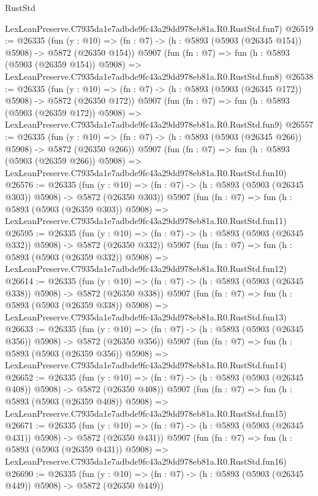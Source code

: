 \begin{lexlean}{RustStd}
\begin{coremodule}
    LexLeanPreserve.C7935da1e7adbde9fc43a29dd978eb81a.R0.RustStd.fun7)
@26519 := @26335
    (fun (y : @10) => (fn : @7) -> (h : @5893 (@5903 (@26345 @154)) @5908) -> @5872 (@26350 @154))
    @5907
    (fun (fn : @7) =>
    fun (h : @5893 (@5903 (@26359 @154)) @5908) =>
    LexLeanPreserve.C7935da1e7adbde9fc43a29dd978eb81a.R0.RustStd.fun8)
@26538 := @26335
    (fun (y : @10) => (fn : @7) -> (h : @5893 (@5903 (@26345 @172)) @5908) -> @5872 (@26350 @172))
    @5907
    (fun (fn : @7) =>
    fun (h : @5893 (@5903 (@26359 @172)) @5908) =>
    LexLeanPreserve.C7935da1e7adbde9fc43a29dd978eb81a.R0.RustStd.fun9)
@26557 := @26335
    (fun (y : @10) => (fn : @7) -> (h : @5893 (@5903 (@26345 @266)) @5908) -> @5872 (@26350 @266))
    @5907
    (fun (fn : @7) =>
    fun (h : @5893 (@5903 (@26359 @266)) @5908) =>
    LexLeanPreserve.C7935da1e7adbde9fc43a29dd978eb81a.R0.RustStd.fun10)
@26576 := @26335
    (fun (y : @10) => (fn : @7) -> (h : @5893 (@5903 (@26345 @303)) @5908) -> @5872 (@26350 @303))
    @5907
    (fun (fn : @7) =>
    fun (h : @5893 (@5903 (@26359 @303)) @5908) =>
    LexLeanPreserve.C7935da1e7adbde9fc43a29dd978eb81a.R0.RustStd.fun11)
@26595 := @26335
    (fun (y : @10) => (fn : @7) -> (h : @5893 (@5903 (@26345 @332)) @5908) -> @5872 (@26350 @332))
    @5907
    (fun (fn : @7) =>
    fun (h : @5893 (@5903 (@26359 @332)) @5908) =>
    LexLeanPreserve.C7935da1e7adbde9fc43a29dd978eb81a.R0.RustStd.fun12)
@26614 := @26335
    (fun (y : @10) => (fn : @7) -> (h : @5893 (@5903 (@26345 @338)) @5908) -> @5872 (@26350 @338))
    @5907
    (fun (fn : @7) =>
    fun (h : @5893 (@5903 (@26359 @338)) @5908) =>
    LexLeanPreserve.C7935da1e7adbde9fc43a29dd978eb81a.R0.RustStd.fun13)
@26633 := @26335
    (fun (y : @10) => (fn : @7) -> (h : @5893 (@5903 (@26345 @356)) @5908) -> @5872 (@26350 @356))
    @5907
    (fun (fn : @7) =>
    fun (h : @5893 (@5903 (@26359 @356)) @5908) =>
    LexLeanPreserve.C7935da1e7adbde9fc43a29dd978eb81a.R0.RustStd.fun14)
@26652 := @26335
    (fun (y : @10) => (fn : @7) -> (h : @5893 (@5903 (@26345 @408)) @5908) -> @5872 (@26350 @408))
    @5907
    (fun (fn : @7) =>
    fun (h : @5893 (@5903 (@26359 @408)) @5908) =>
    LexLeanPreserve.C7935da1e7adbde9fc43a29dd978eb81a.R0.RustStd.fun15)
@26671 := @26335
    (fun (y : @10) => (fn : @7) -> (h : @5893 (@5903 (@26345 @431)) @5908) -> @5872 (@26350 @431))
    @5907
    (fun (fn : @7) =>
    fun (h : @5893 (@5903 (@26359 @431)) @5908) =>
    LexLeanPreserve.C7935da1e7adbde9fc43a29dd978eb81a.R0.RustStd.fun16)
@26690 := @26335
    (fun (y : @10) => (fn : @7) -> (h : @5893 (@5903 (@26345 @449)) @5908) -> @5872 (@26350 @449))

\end{coremodule}
\end{lexlean}

